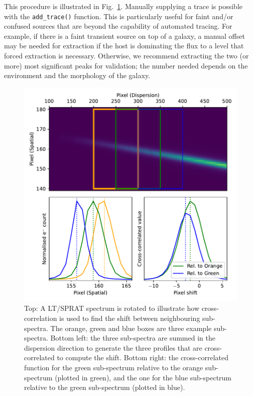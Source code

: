 \documentclass[fleqn,usenatbib]{mnras}
\begin{document}
This procedure is illustrated in Fig.~\ref{fig:trace}. Manually
supplying a trace is possible with the \texttt{add\_trace()}
function. This is particularly useful for faint and/or confused
sources that are beyond the capability of automated tracing. For
example, if there is a faint transient source on top of a galaxy,
a manual offset may be needed for extraction if the host is
dominating the flux to a level that forced extraction is necessary.
Otherwise, we recommend extracting the two (or more) most significant
peaks for validation; the number needed depends on
the environment and the morphology of the galaxy.

\begin{figure}
    \centering
    \includegraphics[width=\columnwidth]{fig_01_tracing.pdf}
    \caption{Top: A LT/SPRAT spectrum is rotated to illustrate how
    cross-correlation is used to find the shift between neighbouring
    sub-spectra. The orange, green and blue boxes are three example
    sub-spectra. Bottom left: the three sub-spectra are summed in
    the dispersion direction to generate the three profiles that are
    cross-correlated to compute the shift. Bottom right: the
    cross-correlated function for the green sub-spectrum relative
    to the orange sub-spectrum (plotted in green), and the one
    for the blue sub-spectrum relative to the green sub-spectrum
    (plotted in blue).}
    \label{fig:trace}
\end{figure}
\end{document}
